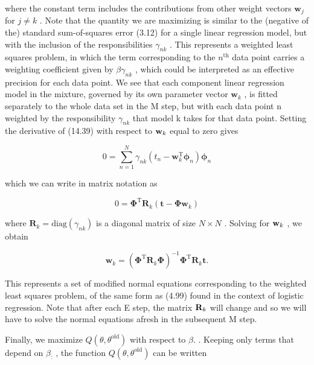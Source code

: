 \documentclass[
  10
]{article}
\begin{document}
where the constant term includes the contributions from other weight
vectors \(\mathbf { w } _ { j }\) for \(j \neq k\) . Note that the
quantity we are maximizing is similar to the (negative of the) standard
sum-of-squares error (3.12) for a single linear regression model, but
with the inclusion of the responsibilities \(\gamma _ { n k }\) . This
represents a weighted least squares problem, in which the term
corresponding to the \(n ^ { \mathrm { t h } }\) data point carries a
weighting coefficient given by \(\beta \gamma _ { n k }\) , which could
be interpreted as an effective precision for each data point. We see
that each component linear regression model in the mixture, governed by
its own parameter vector \(\mathbf { w } _ { k }\) , is fitted
separately to the whole data set in the M step, but with each data point
n weighted by the responsibility \(\gamma _ { n k }\) that model k takes
for that data point. Setting the derivative of (14.39) with respect to
\({ \bf w } _ { k }\) equal to zero gives

\[
0 = \sum_ {n = 1} ^ {N} \gamma_ {n k} \left(t _ {n} - \mathbf {w} _ {k} ^ {\mathrm{T}} \boldsymbol {\phi} _ {n}\right) \boldsymbol {\phi} _ {n}\tag{14.40}
\]

which we can write in matrix notation as

\[
0 = \boldsymbol {\Phi} ^ {\mathrm{T}} \mathbf {R} _ {k} (\mathbf {t} - \boldsymbol {\Phi} \mathbf {w} _ {k})\tag{14.41}
\]

where
\(\mathbf { R } _ { k } = \mathrm { d i a g } ( \gamma _ { n k } )\) is
a diagonal matrix of size \(N \times N\) . Solving for
\({ \bf w } _ { k }\) , we obtain

\[
\mathbf {w} _ {k} = \left(\boldsymbol {\Phi} ^ {\mathrm{T}} \mathbf {R} _ {k} \boldsymbol {\Phi}\right) ^ {- 1} \boldsymbol {\Phi} ^ {\mathrm{T}} \mathbf {R} _ {k} \mathbf {t}.\tag{14.42}
\]

This represents a set of modified normal equations corresponding to the
weighted least squares problem, of the same form as (4.99) found in the
context of logistic regression. Note that after each E step, the matrix
\({ \bf R } _ { k }\) will change and so we will have to solve the
normal equations afresh in the subsequent M step.

Finally, we maximize \(Q ( \theta , \theta ^ { \mathrm { o l d } } )\)
with respect to \(\beta .\) . Keeping only terms that depend on
\(\beta _ { : }\) , the function
\(Q ( \theta , \theta ^ { \mathrm { o l d } } )\) can be written
\end{document}
